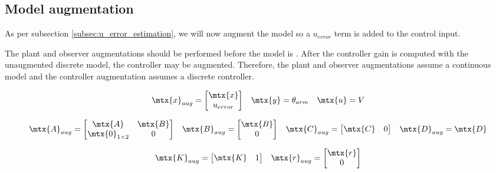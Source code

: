 \subsection{Model augmentation}

As per subsection \ref{subsec:u_error_estimation}, we will now augment the
\gls{model} so a $u_{error}$ term is added to the \gls{control input}.

The \gls{plant} and \gls{observer} augmentations should be performed before the
\gls{model} is . After the \gls{controller}
gain is computed with the unaugmented discrete \gls{model}, the controller may
be augmented. Therefore, the \gls{plant} and \gls{observer} augmentations assume
a continuous \gls{model} and the \gls{controller} augmentation assumes a
discrete \gls{controller}.

\begin{equation*}
  \begin{array}{ccc}
    \mtx{x}_{aug} =
    \begin{bmatrix}
      \mtx{x} \\
      u_{error}
    \end{bmatrix} &
    \mtx{y} = \theta_{arm} &
    \mtx{u} = V
  \end{array}
\end{equation*}

\begin{equation}
  \begin{array}{cccc}
    \mtx{A}_{aug} =
    \begin{bmatrix}
      \mtx{A} & \mtx{B} \\
      \mtx{0}_{1 \times 2} & 0
    \end{bmatrix} &
    \mtx{B}_{aug} =
    \begin{bmatrix}
      \mtx{B} \\
      0
    \end{bmatrix} &
    \mtx{C}_{aug} =
    \begin{bmatrix}
      \mtx{C} & 0
    \end{bmatrix} &
    \mtx{D}_{aug} = \mtx{D}
  \end{array}
\end{equation}

\begin{equation}
  \begin{array}{cc}
    \mtx{K}_{aug} = \begin{bmatrix}
      \mtx{K} & 1
    \end{bmatrix} &
    \mtx{r}_{aug} = \begin{bmatrix}
      \mtx{r} \\
      0
    \end{bmatrix}
  \end{array}
\end{equation}

